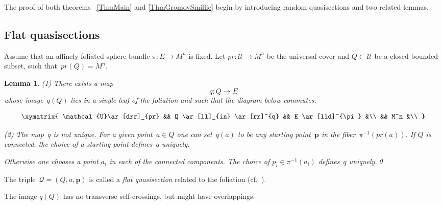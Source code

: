 \documentclass[12pt]{amsart}
\theoremstyle{plain}
\newtheorem{lemma}[theorem]{Lemma}
\theoremstyle{definition}
\theoremstyle{plain}
\theoremstyle{definition}
\begin{document}
The proof of both theorems ~\ref{ThmMain} and \ref{ThmGromovSmillie} begin by introducing   random quasisections and two related lemmas.


\subsection{Flat quasisections} 

Assume that an affinely foliated {sphere} bundle \newline $\pi: E\rightarrow M^n$ is fixed. Let $pr: \mathcal{U}\rightarrow M^n$ be the universal cover and $Q\subset \mathcal{ U}$ be a  { closed} bounded   subset, such that~$pr(Q)=M^n$.
	


\medskip


\begin{lemma}
(1) There exists a map
$$q:Q\rightarrow E$$
whose image~$q(Q)$ lies in a single leaf of the foliation and such that the diagram below commutes.

\begin{equation}
\label{V_G_SquareDiagram2}
    \xymatrix{
   \mathcal{U}\ar[drr]_{pr} &&
Q \ar[ll]_{in} \ar[rr]^{q} &&  E \ar[lld]^{\pi} &\\
     && M^n  &\\    }
\end{equation}

(2) The map~$q$ is not unique. For a given point~$a\in Q$ one can set~$q(a)$ to be any \textit{starting point}~$\mathbf{p}$  in the fiber~$\pi^{-1}(pr(a))$. If $Q$ is connected, the choice of a starting point defines~$q$ uniquely.  

Otherwise one chooses a point $a_i$ in each of the connected components. The choice of  $p_i \in \pi^{-1}(a_i)$ defines~$q$ uniquely.\qed
\end{lemma}




The triple~$\mathcal{Q}=(Q,a,\mathbf{p})$  is called a \textit{flat quasisection} related to the foliation (cf.~\cite{PanTurSh}).


The  image $q(Q)$ has no transverse self-crossings, but might have overlappings.  

\medskip

 
 
\end{document}

